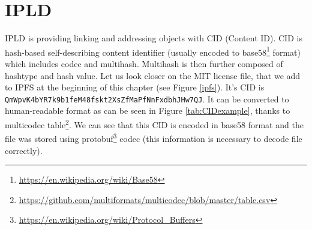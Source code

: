 





\section{IPLD}
IPLD is providing linking and addressing objects with CID (Content ID). CID is hash-based self-describing content identifier (usually encoded to base58\footnote{\url{https://en.wikipedia.org/wiki/Base58}} format) which includes codec and multihash. Multihash is then further composed of hashtype and hash value. Let us look closer on the MIT license file, that we add to IPFS at the beginning of this chapter (see Figure \ref{ipfs}). It's CID is \texttt{QmWpvK4bYR7k9b1feM48fsk\-t2XsZfMaPfNnFxdbhJHw7QJ}. It can be converted to human-readable format as can be seen in Figure \ref{tab:CIDexample}, thanks to multicodec table\footnote{\url{https://github.com/multiformats/multicodec/blob/master/table.csv}}. We can see that this CID is encoded in base58 format and the file was stored using protobuf\footnote{\url{https://en.wikipedia.org/wiki/Protocol\_Buffers}} codec (this information is necessary to decode file correctly).



